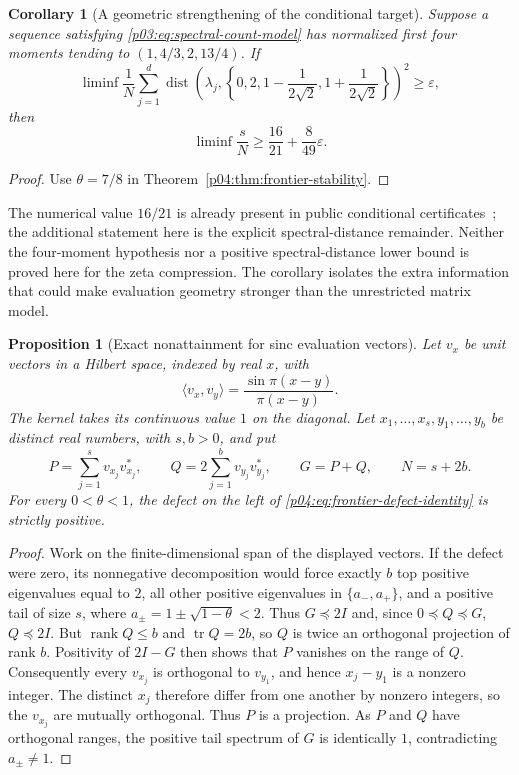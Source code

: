 \documentclass[11pt,letterpaper]{article}
\newtheorem{proposition}[theorem]{Proposition}
\newtheorem{corollary}[theorem]{Corollary}
\theoremstyle{definition}
\theoremstyle{remark}
\newcommand{\1}{\mathbf 1}
\begin{document}
\begin{corollary}[A geometric strengthening of the conditional target]
\label{p04:cor:frontier-geometric}
Suppose a sequence satisfying \eqref{p03:eq:spectral-count-model} has normalized
first four moments tending to $(1,4/3,2,13/4)$. If
\[
 \liminf\frac1N\sum_{j=1}^d
   \operatorname{dist}\left(\lambda_j,
           \left\{0,2,1-\frac1{2\sqrt2},1+\frac1{2\sqrt2}\right\}\right)^2
 \ge\varepsilon,
\]
then
\[
 \liminf\frac{s}{N}\ge\frac{16}{21}+\frac8{49}\varepsilon.
\]
\end{corollary}
\begin{proof}
Use $\theta=7/8$ in Theorem~\ref{p04:thm:frontier-stability}.
\end{proof}

The numerical value $16/21$ is already present in public conditional
certificates~\cite{Jesse}; the additional statement here is the
explicit spectral-distance remainder. Neither the four-moment
hypothesis nor a positive spectral-distance
lower bound is proved here for the zeta compression. The corollary
isolates the extra information that could make evaluation geometry
stronger than the unrestricted matrix model.

\begin{proposition}[Exact nonattainment for sinc evaluation vectors]
\label{p04:prop:frontier-sinc}
Let $v_x$ be unit vectors in a Hilbert space, indexed by real $x$,
with
\[
 \langle v_x,v_y\rangle=
 \frac{\sin\pi(x-y)}{\pi(x-y)}.
\]
The kernel takes its continuous value $1$ on the diagonal.
Let $x_1,\ldots,x_s,y_1,\ldots,y_b$ be distinct real numbers, with
$s,b>0$, and put
\[
 P=\sum_{j=1}^s v_{x_j}v_{x_j}^*,\qquad
 Q=2\sum_{j=1}^b v_{y_j}v_{y_j}^*,\qquad
 G=P+Q,\qquad N=s+2b.
\]
For every $0<\theta<1$, the defect on the left of
\eqref{p04:eq:frontier-defect-identity} is strictly positive.
\end{proposition}
\begin{proof}
Work on the finite-dimensional span of the displayed vectors. If
the defect were zero, its nonnegative decomposition would force
exactly $b$ top positive eigenvalues equal to $2$, all other
positive eigenvalues in $\{a_-,a_+\}$, and a positive tail of size
$s$, where $a_\pm=1\pm\sqrt{1-\theta}<2$.
Thus $G\preceq2I$ and, since $0\preceq Q\preceq G$,
$Q\preceq2I$. But $\operatorname{rank}Q\le b$ and
$\operatorname{tr}Q=2b$, so $Q$ is twice an orthogonal projection
of rank $b$. Positivity of $2I-G$ then shows that $P$ vanishes on
the range of $Q$. Consequently every $v_{x_j}$ is orthogonal to
$v_{y_1}$, and hence $x_j-y_1$ is a nonzero integer. The distinct
$x_j$ therefore differ from one another by nonzero integers, so
the $v_{x_j}$ are mutually orthogonal. Thus $P$ is a projection.
As $P$ and $Q$ have orthogonal ranges, the positive tail spectrum
of $G$ is identically $1$, contradicting $a_\pm\ne1$.
\end{proof}
\end{document}
